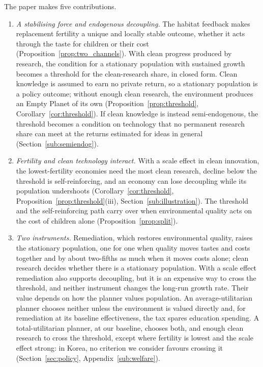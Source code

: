 \documentclass[11pt]{article}
\begin{document}
The paper makes five contributions.
\begin{enumerate}
\item \emph{A stabilising force and endogenous decoupling.} The habitat feedback makes replacement
fertility a unique and locally stable outcome, whether it acts through the taste for children or their
cost (Proposition~\ref{prop:two_channels}). With clean progress produced by research, the condition for
a stationary population with sustained growth becomes a threshold for the clean-research share, in
closed form. Clean knowledge is assumed to earn no private return, so a stationary population is a
policy outcome; without enough clean research, the environment produces an Empty Planet of its own
(Proposition~\ref{prop:threshold}, Corollary~\ref{cor:threshold}). If clean knowledge is instead
semi-endogenous, the threshold becomes a condition on technology that no permanent research share can
meet at the returns estimated for ideas in general (Section~\ref{sub:semiendog}).
\item \emph{Fertility and clean technology interact.} With a scale effect in clean innovation, the
lowest-fertility economies need the most clean research, decline below the threshold is
self-reinforcing, and an economy can lose decoupling while its population undershoots
(Corollary~\ref{cor:threshold}, Proposition~\ref{prop:threshold}(iii), Section~\ref{sub:illustration}).
The threshold and the self-reinforcing path carry over when environmental quality acts on the cost of
children alone (Proposition~\ref{prop:split}).
\item \emph{Two instruments.} Remediation, which restores environmental quality, raises the stationary
population, one for one when quality moves tastes and costs together and by about two-fifths as much when
it moves costs alone; clean research decides whether there is a stationary population. With a scale
effect remediation also supports decoupling, but it is an expensive way to cross the threshold, and
neither instrument changes the long-run growth rate. Their value depends on how the planner values
population. An average-utilitarian planner chooses neither unless the environment is valued directly
and, for remediation at its baseline effectiveness, the tax spares education spending. A
total-utilitarian planner, at our baseline, chooses both, and enough clean research to cross the
threshold, except where fertility is lowest and the scale effect strong: in Korea, no criterion we
consider favours crossing it (Section~\ref{sec:policy}, Appendix~\ref{sub:welfare}).

\end{enumerate}
\end{document}
